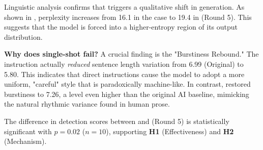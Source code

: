 Linguistic analysis confirms that \bullying triggers a qualitative shift in generation. As shown in , perplexity increases from 16.1 in the \singleshot case to 19.4 in \bullying (Round 5). This suggests that the model is forced into a higher-entropy region of its output distribution. 

{\bf Why does single-shot fail?} A crucial finding is the "Burstiness Rebound." The \singleshot instruction actually {\it reduced} sentence length variation from 6.99 (Original) to 5.80. This indicates that direct instructions cause the model to adopt a more uniform, "careful" style that is paradoxically machine-like. In contrast, \bullying restored burstiness to 7.26, a level even higher than the original AI baseline, mimicking the natural rhythmic variance found in human prose.

The difference in detection scores between \singleshot and \bullying (Round 5) is statistically significant with $p = 0.02$ ($n=10$), supporting \textbf{H1} (Effectiveness) and \textbf{H2} (Mechanism).
